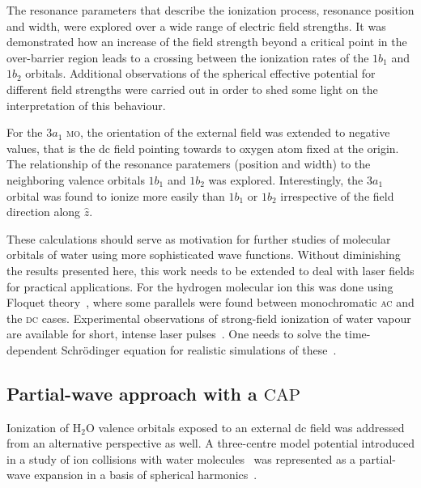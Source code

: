 The resonance parameters that describe the ionization process,
resonance position and width, were explored over a wide range of
electric field strengths. It was demonstrated how an increase of the
field strength beyond a critical point in the over-barrier region
leads to a crossing between the ionization rates of the $1b_{1}$ and
$1b_{2}$ orbitals. Additional observations of the spherical effective
potential for different field strengths were carried out in order to
shed some light on the interpretation of this behaviour.

For the $3a_{1}$ \textsc{mo}, the orientation of the external field
was extended to negative values, that is the dc field pointing towards
to oxygen atom fixed at the origin. The relationship of the resonance
paratemers (position and width) to the neighboring valence orbitals
$1b_{1}$ and $1b_{2}$ was explored. Interestingly, the $3a_{1}$
orbital was found to ionize more easily than $1b_{1}$ or $1b_{2}$
irrespective of the field direction along $\hat{z}$.

These calculations should serve as motivation for further studies of
molecular orbitals of water using more sophisticated wave
functions. Without diminishing the results presented here, this work
needs to be extended to deal with laser fields for practical
applications. For the hydrogen molecular ion this was done using
Floquet theory~\cite{Tsog_H2mol_ac_2013}, where some parallels were
found between monochromatic \textsc{ac} and the \textsc{dc}
cases. Experimental observations of strong-field ionization of water
vapour are available for short, intense laser
pulses~\cite{exp_h2o_laser_2008,exp_h2o_laser_2014}. One needs to
solve the time-dependent Schr\"{o}dinger equation for realistic
simulations of these~\cite{Farrell_2011,Falge_2010}.


\subsection*{Partial-wave approach with a $\mathrm{CAP}$}

Ionization of H$_{2}$O valence orbitals exposed to an external dc
field was addressed from an alternative perspective as well. A
three-centre model potential introduced in a study of ion collisions
with water molecules~\cite{illescas_modelV_2011} was represented as a
partial-wave expansion in a basis of spherical
harmonics~\cite{marko_partialwave}.




